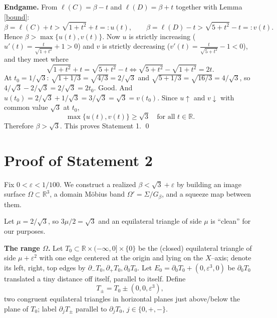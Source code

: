 \medskip
\noindent\textbf{Endgame.} From $\ell(C)=\beta-t$ and $\ell(D)=\beta+t$ together
with Lemma \ref{bound}:
\[
\beta=\ell(C)+t>\sqrt{1+t^2}+t=:u(t),\qquad
\beta=\ell(D)-t>\sqrt{5+t^2}-t=:v(t).
\]
Hence $\beta>\max\{u(t),v(t)\}$. Now $u$ is strictly increasing
($u'(t)=\frac{t}{\sqrt{1+t^2}}+1>0$) and $v$ is strictly decreasing
($v'(t)=\frac{t}{\sqrt{5+t^2}}-1<0$), and they meet where
\[
\sqrt{1+t^2}+t=\sqrt{5+t^2}-t\iff \sqrt{5+t^2}-\sqrt{1+t^2}=2t.
\]
At $t_0=1/\sqrt3$: $\sqrt{1+1/3}=\sqrt{4/3}=2/\sqrt3$ and
$\sqrt{5+1/3}=\sqrt{16/3}=4/\sqrt3$, so $4/\sqrt3-2/\sqrt3=2/\sqrt3=2t_0$. Good. And
$u(t_0)=2/\sqrt3+1/\sqrt3=3/\sqrt3=\sqrt3=v(t_0)$. Since $u\uparrow$ and
$v\downarrow$ with common value $\sqrt3$ at $t_0$,
\[
\max\{u(t),v(t)\}\ge\sqrt3\quad\text{for all }t\in\mathbb{R}.
\]
Therefore $\beta>\sqrt3$. This proves Statement 1. \qed

\section{Proof of Statement 2}

Fix $0<\varepsilon<1/100$. We construct a realized $\beta<\sqrt3+\varepsilon$ by
building an image surface $\Omega\subset\mathbb{R}^3$, a domain Möbius band
$\Omega'=\Sigma/G_\beta$, and a squeeze map between them.

Let $\mu=2/\sqrt3$, so $3\mu/2=\sqrt3$ and an equilateral triangle of side $\mu$ is
``clean'' for our purposes.

\medskip
\noindent\textbf{The range $\Omega$.}
Let $T_0\subset\mathbb{R}\times(-\infty,0]\times\{0\}$ be the (closed) equilateral
triangle of side $\mu+\varepsilon^2$ with one edge centered at the origin and lying
on the $X$--axis; denote its left, right, top edges by
$\partial_-T_0,\partial_+T_0,\partial_0T_0$. Let
$E_0=\partial_0T_0+(0,\varepsilon^3,0)$ be $\partial_0T_0$ translated a tiny
distance off itself, parallel to itself. Define
\[
T_{\pm}=T_0\pm(0,0,\varepsilon^3),
\]
two congruent equilateral triangles in horizontal planes just above/below the plane
of $T_0$; label $\partial_jT_{\pm}$ parallel to $\partial_jT_0$, $j\in\{0,+,-\}$.

